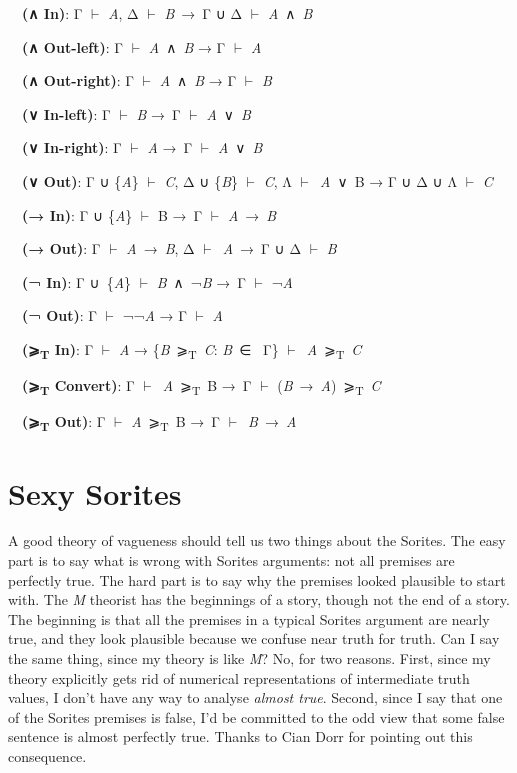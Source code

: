 \documentclass[
  11pt,
  letterpaper,
  DIV=11,
  numbers=noendperiod,
  twoside]{scrartcl}
\begin{document}
~~\textbf{(∧ In)}: Γ \(\vdash\) \emph{A}, Δ \(\vdash\) \emph{B}~→~Γ ∪ Δ
\(\vdash\) \emph{A}~∧~\emph{B}\\
\strut ~~\textbf{(∧ Out-left)}: Γ \(\vdash\) \emph{A}~∧~\emph{B} → Γ
\(\vdash\) \emph{A}\\
\strut ~~\textbf{(∧ Out-right)}: Γ \(\vdash\) \emph{A}~∧~\emph{B} → Γ
\(\vdash\) \emph{B}\\
\strut ~~\textbf{(∨ In-left)}: Γ \(\vdash\) \emph{B} →~Γ \(\vdash\)
\emph{A}~∨~\emph{B}\\
\strut ~~\textbf{(∨ In-right)}: Γ \(\vdash\) \emph{A} →~Γ \(\vdash\)
\emph{A}~∨~\emph{B}\\
\strut ~~\textbf{(∨ Out)}: Γ ∪ \{\emph{A}\} \(\vdash\) \emph{C}, Δ ∪
\{\emph{B}\} \(\vdash\) \emph{C}, Λ \(\vdash\)~\emph{A}~∨~B → Γ ∪ Δ ∪ Λ
\(\vdash\) \emph{C}\\
\strut ~~\textbf{(→ In)}: Γ ∪ \{\emph{A}\} \(\vdash\) B →~Γ \(\vdash\)
\emph{A}~→~\emph{B}\\
\strut ~~\textbf{(→ Out)}: Γ \(\vdash\) \emph{A}~→~\emph{B}, Δ
\(\vdash\)~\emph{A}~→~Γ ∪ Δ \(\vdash\) \emph{B}\\
\strut ~~\textbf{(¬ In)}: Γ ∪~\{\emph{A}\} \(\vdash\)
\emph{B}~∧~¬\emph{B} →~Γ \(\vdash\) ¬\emph{A}\\
\strut ~~\textbf{(¬ Out)}: Γ \(\vdash\) ¬¬\emph{A} → Γ \(\vdash\)
\emph{A}\\
\strut ~~\textbf{(⩾\textsubscript{T} In)}: Γ \(\vdash\) \emph{A} →
\{\emph{B}~⩾\textsubscript{T}~\emph{C}: \emph{B}~∈~ Γ\}
\(\vdash\)~\emph{A}~⩾\textsubscript{T}~\emph{C}\\
\strut ~~\textbf{(⩾\textsubscript{T} Convert)}: Γ
\(\vdash\)~\emph{A}~⩾\textsubscript{T}~B →~Γ \(\vdash\)
(\emph{B}~→~\emph{A})~⩾\textsubscript{T}~\emph{C}\\
\strut ~~\textbf{(⩾\textsubscript{T} Out)}: Γ \(\vdash\)
\emph{A}~⩾\textsubscript{T}~B →~Γ \(\vdash\)~\emph{B}~→~\emph{A}

\section{Sexy Sorites}\label{sexy-sorites}

A good theory of vagueness should tell us two things about the Sorites.
The easy part is to say what is wrong with Sorites arguments: not all
premises are perfectly true. The hard part is to say why the premises
looked plausible to start with. The \emph{M} theorist has the beginnings
of a story, though not the end of a story. The beginning is that all the
premises in a typical Sorites argument are nearly true, and they look
plausible because we confuse near truth for truth. Can I say the same
thing, since my theory is like \emph{M}? No, for two reasons. First,
since my theory explicitly gets rid of numerical representations of
intermediate truth values, I don't have any way to analyse \emph{almost
true}. Second, since I say that one of the Sorites premises is false,
I'd be committed to the odd view that some false sentence is almost
perfectly true. Thanks to Cian Dorr for pointing out this consequence.
\end{document}
